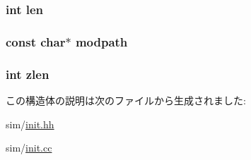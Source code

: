 \label{structEmbeddedPython_a41075c0fd7283165b45b2d6938d85c2f}
\hypertarget{structEmbeddedPython_afed088663f8704004425cdae2120b9b3}{
\subsubsection[{len}]{\setlength{\rightskip}{0pt plus 5cm}int {\bf len}}}
\label{structEmbeddedPython_afed088663f8704004425cdae2120b9b3}
\hypertarget{structEmbeddedPython_adb35c720a17cc1108823c3bf5591d4e1}{
\subsubsection[{modpath}]{\setlength{\rightskip}{0pt plus 5cm}const char$\ast$ {\bf modpath}}}
\label{structEmbeddedPython_adb35c720a17cc1108823c3bf5591d4e1}
\hypertarget{structEmbeddedPython_a0dbae0464f702cabe3fca2905e9f5558}{
\subsubsection[{zlen}]{\setlength{\rightskip}{0pt plus 5cm}int {\bf zlen}}}
\label{structEmbeddedPython_a0dbae0464f702cabe3fca2905e9f5558}


この構造体の説明は次のファイルから生成されました:\begin{DoxyCompactItemize}
\item 
sim/\hyperlink{init_8hh}{init.hh}\item 
sim/\hyperlink{init_8cc}{init.cc}\end{DoxyCompactItemize}
